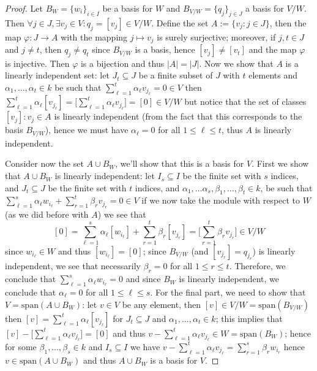 \begin{proof}
  Let \(B_W = \{w_i\}_{i \in I}\) be a basis for \(W\) and  \(B_{V/W} =
  \{q_j\}_{j \in J}\) a basis for \(V/W\). Then \(\forall j \in J, \exists v_j
  \in V : q_j = [v_j] \in V/W\). Define the set \(A := \{v_j : j \in J\}\),
  then the map \(\varphi : J \to A\) with the mapping \(j \mapsto v_j\) is
  surely surjective; moreover, if \(j, t \in J\) and  \(j \neq t\), then \(q_j
  \neq q_t\) since \(B_{V/W}\) is a basis, hence \([v_j] \neq [v_t]\) and the
  map \(\varphi\) is injective. Then \(\varphi\) is a bijection and thus \(|A| =
  |J|\). Now we show that \(A\) is a linearly independent set: let \(J_t
  \subseteq J\) be a finite subset of \(J\) with \(t\) elements and \(\alpha_1,
  \dots, \alpha_t \in k\) be such that \(\sum_{\ell=1}^t \alpha_\ell v_{j_\ell}
  = 0 \in V\) then \(\sum_{\ell=1}^t \alpha_\ell [v_{j_\ell}] = \big[
  \sum_{\ell=1}^t \alpha_\ell v_{j_\ell} \big] = [0] \in V/W\) but notice that
  the set of classes \([v_j] : v_j \in A\) is linearly independent (from the
  fact that this corresponds to the basis \(B_{V/W}\)), hence we must have
  \(\alpha_\ell = 0\) for all \(1 \leq \ell \leq t\), thus \(A\) is linearly
  independent.

  Consider now the set \(A \cup B_W\), we'll show that this is a basis for
  \(V\). First we show that \(A \cup B_W\) is linearly independent: let \(I_s
  \subseteq I\) be the finite set with \(s\) indices, and \(J_t \subseteq J\) be
  the finite set with \(t\) indices, and \(\alpha_1, \dots \alpha_s, \beta_1,
  \dots, \beta_t \in k\), be such that \(\sum_{\ell=1}^s \alpha_\ell w_{i_\ell}
  + \sum_{r=1}^t \beta_r v_{j_r} = 0 \in V\) if we now take the module with
  respect to \(W\) (as we did before with \(A\)) we see that
  \[
    [0] = \sum_{\ell=1}^s\alpha_\ell [w_{i_\ell}]
    + \sum_{r=1}^t \beta_r [v_{j_r}] = \bigg[\sum_{r=1}^t \beta_r v_{j_r}\bigg]
    \in V/W
  \]
  since \(w_{i_\ell} \in W\) and thus \([w_{i_\ell}] = [0]\); since \(B_{V/W}\)
  (and \([v_{j_r}] = q_{j_r}\)) is linearly independent, we see that
  necessarily \(\beta_r = 0\) for all \(1 \leq r \leq t\). Therefore, we
  conclude that \(\sum_{\ell=1}^s \alpha_\ell w_{i_\ell} = 0\) and since \(B_W\)
  is linearly independent, we conclude that \(\alpha_{\ell} = 0\) for all  \(1
  \leq \ell \leq s\). For the final part, we need to show that \(V =
  \mathrm{span}(A \cup B_{W})\): let \(v \in V\) be any element, then \([v] \in
  V/W = \mathrm{span}(B_{V/W})\) then \([v] = \sum_{\ell=1}^t \alpha_\ell
  [v_{j_\ell}]\) for \(J_t \subseteq J\) and \(\alpha_1, \dots, \alpha_t \in
  k\); this implies that \([v] - \big[ \sum_{\ell=1}^t \alpha_\ell v_{j_\ell}
  \big] = [0]\) and thus \(v - \sum_{\ell=1}^t \alpha_\ell v_{j_\ell} \in W =
  \mathrm{span}(B_{W})\); hence for some \(\beta_1, \dots, \beta_s \in k\) and
  \(I_s \subseteq I\) we have \(v - \sum_{\ell=1}^t \alpha_\ell v_{j_\ell} =
  \sum_{r=1}^s \beta_r w_{i_r}\) hence \(v \in \mathrm{span}(A \cup B_{W})\) and
  thus \(A \cup B_W\) is a basis for \(V\).


\end{proof}

